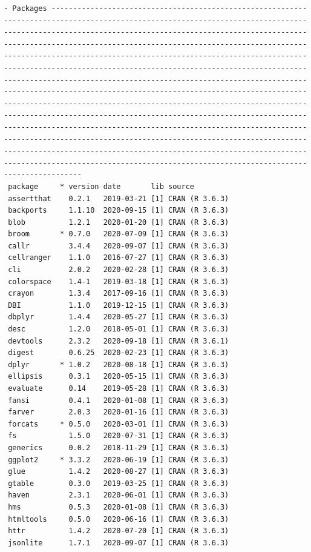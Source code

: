 \documentclass[
]{article}
\begin{document}
\begin{verbatim}
- Packages ---------------------------------------------------------------------------------------------------------------------------------------------------------------------------------------------------------------------------------------------------------------------------------------------------------------------------------------------------------------------------------------------------------------------------------------------------------------------------------------------------------------------------------------------------------------------------------------------------------------------------------------------------------------------------------------------------------------------------------------------------------------------------------------------------------------------------------------------------------------------------------------------------------------------------------------------------------------------------------------------------------------------------
 package     * version date       lib source        
 assertthat    0.2.1   2019-03-21 [1] CRAN (R 3.6.3)
 backports     1.1.10  2020-09-15 [1] CRAN (R 3.6.3)
 blob          1.2.1   2020-01-20 [1] CRAN (R 3.6.3)
 broom       * 0.7.0   2020-07-09 [1] CRAN (R 3.6.3)
 callr         3.4.4   2020-09-07 [1] CRAN (R 3.6.3)
 cellranger    1.1.0   2016-07-27 [1] CRAN (R 3.6.3)
 cli           2.0.2   2020-02-28 [1] CRAN (R 3.6.3)
 colorspace    1.4-1   2019-03-18 [1] CRAN (R 3.6.3)
 crayon        1.3.4   2017-09-16 [1] CRAN (R 3.6.3)
 DBI           1.1.0   2019-12-15 [1] CRAN (R 3.6.3)
 dbplyr        1.4.4   2020-05-27 [1] CRAN (R 3.6.3)
 desc          1.2.0   2018-05-01 [1] CRAN (R 3.6.3)
 devtools      2.3.2   2020-09-18 [1] CRAN (R 3.6.1)
 digest        0.6.25  2020-02-23 [1] CRAN (R 3.6.3)
 dplyr       * 1.0.2   2020-08-18 [1] CRAN (R 3.6.3)
 ellipsis      0.3.1   2020-05-15 [1] CRAN (R 3.6.3)
 evaluate      0.14    2019-05-28 [1] CRAN (R 3.6.3)
 fansi         0.4.1   2020-01-08 [1] CRAN (R 3.6.3)
 farver        2.0.3   2020-01-16 [1] CRAN (R 3.6.3)
 forcats     * 0.5.0   2020-03-01 [1] CRAN (R 3.6.3)
 fs            1.5.0   2020-07-31 [1] CRAN (R 3.6.3)
 generics      0.0.2   2018-11-29 [1] CRAN (R 3.6.3)
 ggplot2     * 3.3.2   2020-06-19 [1] CRAN (R 3.6.3)
 glue          1.4.2   2020-08-27 [1] CRAN (R 3.6.3)
 gtable        0.3.0   2019-03-25 [1] CRAN (R 3.6.3)
 haven         2.3.1   2020-06-01 [1] CRAN (R 3.6.3)
 hms           0.5.3   2020-01-08 [1] CRAN (R 3.6.3)
 htmltools     0.5.0   2020-06-16 [1] CRAN (R 3.6.3)
 httr          1.4.2   2020-07-20 [1] CRAN (R 3.6.3)
 jsonlite      1.7.1   2020-09-07 [1] CRAN (R 3.6.3)

\end{verbatim}
\end{document}
